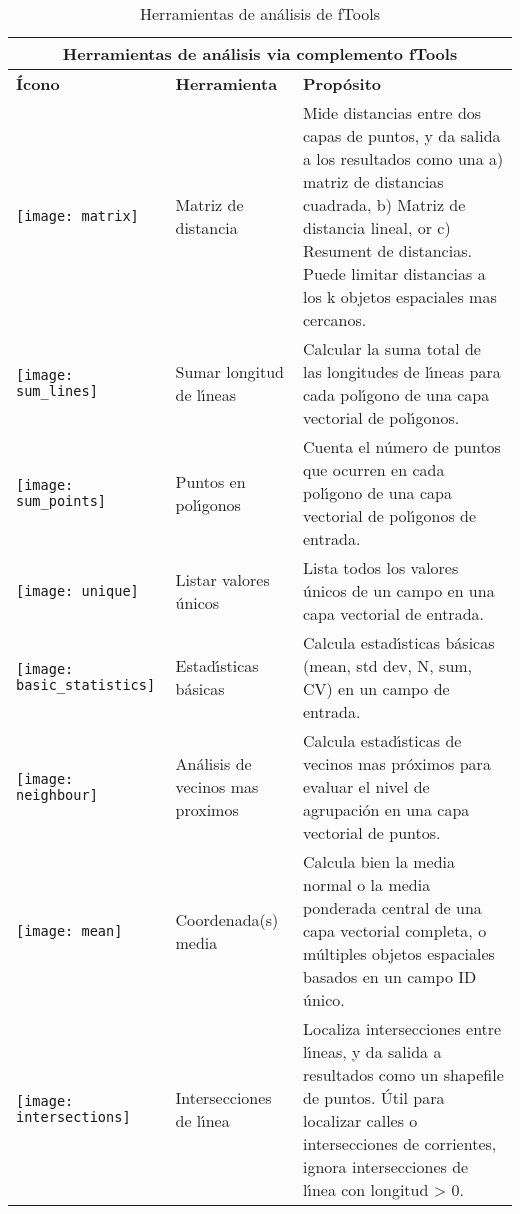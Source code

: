 \begin{table}[ht]
\centering
\caption{Herramientas de an\'alisis de fTools}\label{tab:ftool_analysis}\medskip
 \begin{tabular}{|p{0.3in}|p{1.2in}|p{4.7in}|}
 \hline \multicolumn{3}{|c|}{\textbf{Herramientas de an\'alisis via complemento fTools}} \\
 \hline \textbf{\'Icono} & \textbf{Herramienta} & \textbf{Prop\'osito} \\
 \hline \texttt{[image: matrix]} & Matriz de distancia &
Mide distancias entre dos capas de puntos, y da salida a los resultados como una a) matriz
de distancias cuadrada, b) Matriz de distancia lineal, or c) Resument de distancias. Puede limitar distancias
a los k objetos espaciales mas cercanos. \\ 
 \hline \texttt{[image: sum\_lines]} & Sumar longitud de l\'{\i}neas & Calcular
la suma total de las longitudes de l\'{\i}neas para cada pol\'{\i}gono de una capa vectorial de pol\'{\i}gonos. \\
 \hline \texttt{[image: sum\_points]} & Puntos en pol\'{\i}gonos & Cuenta el n\'umero
de puntos que ocurren en cada pol\'{\i}gono de una capa vectorial de pol\'{\i}gonos de entrada. \\
 \hline \texttt{[image: unique]} & Listar valores \'unicos & Lista
todos los valores \'unicos de un campo en una capa vectorial de entrada. \\
 \hline \texttt{[image: basic\_statistics]} & Estad\'{\i}sticas b\'asicas & Calcula
estad\'{\i}sticas b\'asicas (mean, std dev, N, sum, CV) en un campo de entrada. \\ 
 \hline \texttt{[image: neighbour]} & An\'alisis de vecinos mas proximos
& Calcula estad\'{\i}sticas de vecinos mas pr\'oximos para evaluar el nivel de agrupaci\'on en una
capa vectorial de puntos. \\
 \hline \texttt{[image: mean]} & Coordenada(s) media &
Calcula bien la media normal o la media ponderada central de una capa vectorial completa,
o m\'ultiples objetos espaciales basados en un campo ID \'unico. \\ 
 \hline \texttt{[image: intersections]} & Intersecciones de l\'{\i}nea &
Localiza intersecciones entre l\'{\i}neas, y da salida a resultados como un shapefile de puntos.
\'Util para localizar calles o intersecciones de corrientes, ignora intersecciones de l\'{\i}nea
con longitud > 0. \\
 \hline
\end{tabular}
\end{table}


